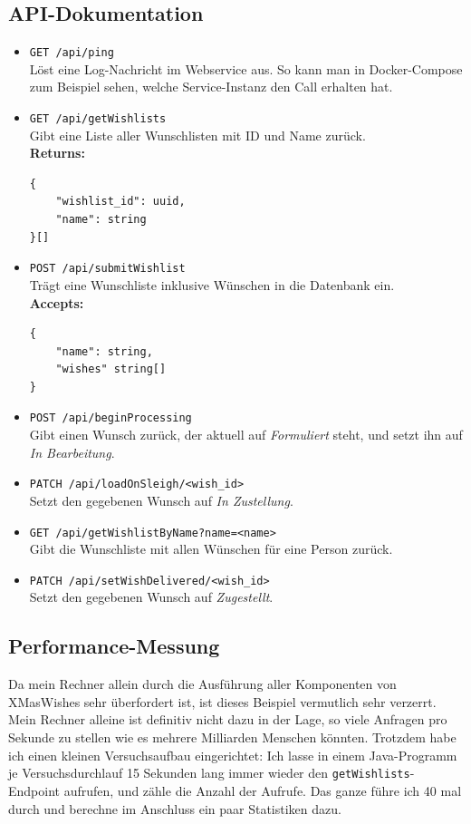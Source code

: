 \documentclass[12pt]{article}
\begin{document}
\subsection*{API-Dokumentation}
\begin{itemize}
	\item \texttt{GET /api/ping}\\ Löst eine Log-Nachricht im Webservice aus. So kann man in Docker-Compose zum Beispiel sehen, welche Service-Instanz den Call erhalten hat.
	
	\item \texttt{GET /api/getWishlists}\\ Gibt eine Liste aller Wunschlisten mit ID und Name zurück.\\
	\textbf{Returns:}
	\begin{lstlisting}
{
	"wishlist_id": uuid,
	"name": string
}[]
	\end{lstlisting}
	
	\item \texttt{POST /api/submitWishlist}\\ Trägt eine Wunschliste inklusive Wünschen in die Datenbank ein.\\
	\textbf{Accepts:}
	\begin{lstlisting}
{
	"name": string,
	"wishes" string[]
}
	\end{lstlisting}
	
	\item \texttt{POST /api/beginProcessing}\\ Gibt einen Wunsch zurück, der aktuell auf \emph{Formuliert} steht, und setzt ihn auf \emph{In Bearbeitung}.
	
	\item \texttt{PATCH /api/loadOnSleigh/<wish\_id>}\\ Setzt den gegebenen Wunsch auf \emph{In Zustellung}.
	
	\item \texttt{GET /api/getWishlistByName?name=<name>}\\ Gibt die Wunschliste mit allen Wünschen für eine Person zurück.
	
	\item \texttt{PATCH /api/setWishDelivered/<wish\_id>}\\ Setzt den gegebenen Wunsch auf \emph{Zugestellt}.
	
\end{itemize}

\subsection*{Performance-Messung}
Da mein Rechner allein durch die Ausführung aller Komponenten von XMasWishes sehr überfordert ist, ist dieses Beispiel vermutlich sehr verzerrt.
Mein Rechner alleine ist definitiv nicht dazu in der Lage, so viele Anfragen pro Sekunde zu stellen wie es mehrere Milliarden Menschen könnten.
Trotzdem habe ich einen kleinen Versuchsaufbau eingerichtet:
Ich lasse in einem Java-Programm je Versuchsdurchlauf 15 Sekunden lang immer wieder den \texttt{getWishlists}-Endpoint aufrufen, und zähle die Anzahl der Aufrufe. Das ganze führe ich 40 mal durch und berechne im Anschluss ein paar Statistiken dazu.
\end{document}
